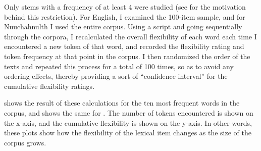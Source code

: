 Only stems with a frequency of at least 4 were studied (see  for the motivation behind this restriction). For English, I examined the 100-item sample, and for Nuuchahnulth I used the entire corpus. Using a script and going sequentially through the corpora, I recalculated the overall flexibility of each word each time I encountered a new token of that word, and recorded the flexibility rating and token frequency at that point in the corpus. I then randomized the order of the texts and repeated this process for a total of 100 times, so as to avoid any ordering effects, thereby providing a sort of \enquote{confidence interval} for the cumulative flexibility ratings.

 shows the result of these calculations for the ten most frequent words in the  corpus, and  shows the same for . The number of tokens encountered is shown on the x-axis, and the cumulative flexibility is shown on the y-axis. In other words, these plots show how the flexibility of the lexical item changes as the size of the corpus grows.

